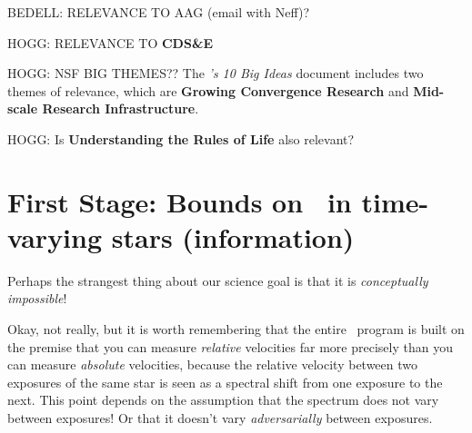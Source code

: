 \documentclass[12pt, letterpaper]{article}
\begin{document}
BEDELL: RELEVANCE TO AAG (email with Neff)?

HOGG: RELEVANCE TO \textbf{CDS\&E}

HOGG: NSF BIG THEMES?? The \textit{\NSF's 10 Big Ideas} document
includes two themes of relevance, which are \textbf{Growing
  Convergence Research} and \textbf{Mid-scale Research
  Infrastructure}.

HOGG: Is \textbf{Understanding the Rules of Life} also relevant?


\section{First Stage: Bounds on \EPRV\ in time-varying stars (information)}

Perhaps the strangest thing about our science goal is that
it is \emph{conceptually impossible}!

Okay, not really, but it is worth remembering that the entire
\EPRV\ program is built on the premise that you can measure
\emph{relative} velocities far more precisely than you can measure
\emph{absolute} velocities, because the relative velocity between two
exposures of the same star is seen as a spectral shift from one
exposure to the next.
This point depends on the assumption that the spectrum does not vary
between exposures!
Or that it doesn't vary \emph{adversarially} between exposures.
\end{document}
